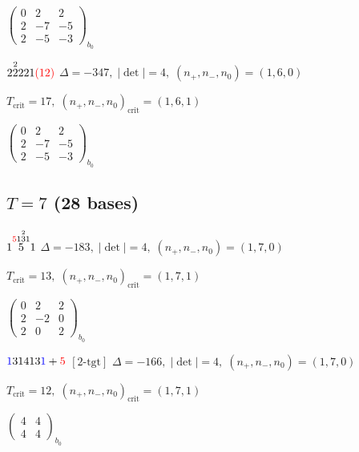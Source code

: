 \documentclass[10pt]{article}
\begin{document}
\hspace{2em}$\left(\begin{smallmatrix}0 & 2 & 2 \\ 2 & -7 & -5 \\ 2 & -5 & -3\end{smallmatrix}\right)_{\!b_0}$

\smallskip

$2\overset{2}{2}221\textcolor{red}{(12)}$ \quad $\Delta=-347,\; |\det|=4,\; (n_+,n_-,n_0)=(1,6,0)$

\hspace{1em}$T_{\text{crit}}=17,\; (n_+,n_-,n_0)_{\text{crit}}=(1,6,1)$

\hspace{2em}$\left(\begin{smallmatrix}0 & 2 & 2 \\ 2 & -7 & -5 \\ 2 & -5 & -3\end{smallmatrix}\right)_{\!b_0}$


\subsection*{$T = 7$ \quad (28 bases)}
\smallskip

$1\overset{\textcolor{red}{5}1\overset{2}{3}1}{5}1$ \quad $\Delta=-183,\; |\det|=4,\; (n_+,n_-,n_0)=(1,7,0)$

\hspace{1em}$T_{\text{crit}}=13,\; (n_+,n_-,n_0)_{\text{crit}}=(1,7,1)$

\hspace{2em}$\left(\begin{smallmatrix}0 & 2 & 2 \\ 2 & -2 & 0 \\ 2 & 0 & 2\end{smallmatrix}\right)_{\!b_0}$

\smallskip

$\textcolor{blue}{1}31413\textcolor{blue}{1}+\textcolor{red}{5}$ $\scriptstyle [2\text{-tgt}]$ \quad $\Delta=-166,\; |\det|=4,\; (n_+,n_-,n_0)=(1,7,0)$

\hspace{1em}$T_{\text{crit}}=12,\; (n_+,n_-,n_0)_{\text{crit}}=(1,7,1)$

\hspace{2em}$\left(\begin{smallmatrix}4 & 4 \\ 4 & 4\end{smallmatrix}\right)_{\!b_0}$
\end{document}
